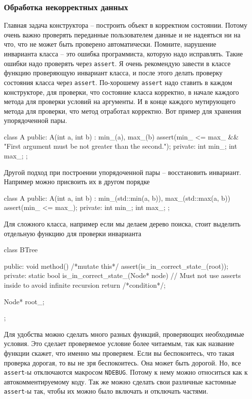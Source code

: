 \subsubsection{Обработка некорректных данных}

Главная задача конструктора -- построить объект в корректном состоянии.
Потому очень важно проверять переданные пользователем данные и не надеяться ни на что, что не может быть проверено автоматически.
Помните, нарушение инварианта класса -- это ошибка программиста, которую надо исправлять.
Такие ошибки надо проверять через \verb"assert".
Я очень рекомендую завести в классе функцию проверяющую инвариант класса, и после этого делать проверку состояния класса через \verb"assert".
По-хорошему \verb"assert" надо ставить в каждом конструкторе, для проверки, что состояние класса корректно, в начале каждого метода для проверки условий на аргументы.
И в конце каждого мутирующего метода для проверки, что метод отработал корректно.
Вот пример для хранения упорядоченной пары.
\begin{cppcode}
class A {
public:
  A(int a, int b) : min_(a), max_(b) {
    assert(min_ <= max_ && "First argument must be not greater than the second.");
  }
private:
  int min_;
  int max_;
};
\end{cppcode}
Другой подход при построении упорядоченной пары -- восстановить инвариант.
Например можно присвоить их в другом порядке
\begin{cppcode}
class A {
public:
  A(int a, int b) : min_(std::min(a, b)), max_(std::max(a, b)) {
    assert(min_ <= max_);
  }
private:
  int min_;
  int max_;
};
\end{cppcode}
Для сложного класса, например если мы делаем дерево поиска, стоит выделить отдельную функцию для проверки инварианта
\begin{cppcode}
class BTree {
public:
  void method() {
    /*mutate this*/
    assert(is_in_correct_state_(root));
  }
private:
  static bool is_in_correct_state_(Node* node) {
    // Must not use asserts inside to avoid infinite recursion
    return /*condition*/;
  }

  Node* root_;
};
\end{cppcode}
Для удобства можно сделать много разных функций, проверяющих необходимые условия.
Это сделает проверяемое условие более читаемым, так как название функции скажет, что именно мы проверяем.
Если вы беспокоитесь, что такая проверка дорогая, то вы не зря беспокоитесь.
Она может быть дорогой.
Но, все \verb"assert"-ы отключаются макросом \verb"NDEBUG".
Потому к нему можно относиться как к автокомментируемому коду.
Так же можно сделать свои различные кастомные \verb"assert"-ы так, чтобы их можно было включать и отключать частями.


